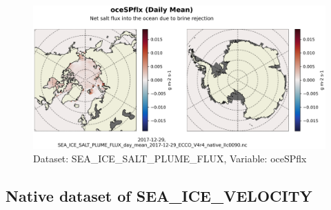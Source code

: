 \begin{figure}[H]
\centering
\includegraphics[scale=0.55]{../images/plots/native_plots/Sea-Ice_Salt_Plume_Fluxes/oceSPflx.png}
\caption{Dataset: SEA\_ICE\_SALT\_PLUME\_FLUX, Variable: oceSPflx}
\label{tab:table-SEA_ICE_SALT_PLUME_FLUX_oceSPflx-Plot}
\end{figure}
\subsection{Native dataset of SEA\_ICE\_VELOCITY}
\newp
